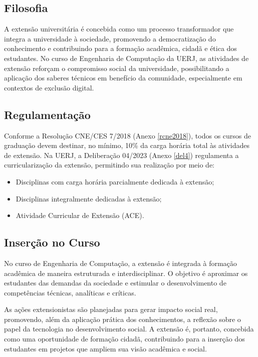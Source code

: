 \subsection{Filosofia}
A extensão universitária é concebida como um processo transformador que integra a universidade à sociedade, promovendo a democratização do conhecimento e contribuindo para a formação acadêmica, cidadã e ética dos estudantes. No curso de Engenharia de Computação da UERJ, as atividades de extensão reforçam o compromisso social da universidade, possibilitando a aplicação dos saberes técnicos em benefício da comunidade, especialmente em contextos de exclusão digital.

\subsection{Regulamentação}
Conforme a Resolução CNE/CES  7/2018 (Anexo \ref{rcne2018}), todos os cursos de graduação devem destinar, no mínimo, 10\% da carga horária total às atividades de extensão. Na UERJ, a Deliberação  04/2023 (Anexo \ref{del4}) regulamenta a curricularização da extensão, permitindo sua realização por meio de:

\begin{itemize}
    \item Disciplinas com carga horária parcialmente dedicada à extensão;
    \item Disciplinas integralmente dedicadas à extensão;
    \item Atividade Curricular de Extensão (ACE).
\end{itemize}

\subsection{Inserção no Curso}

No curso de Engenharia de Computação, a extensão é integrada à formação acadêmica de maneira estruturada e interdisciplinar. O objetivo é aproximar os estudantes das demandas da sociedade e estimular o desenvolvimento de competências técnicas, analíticas e críticas.

As ações extensionistas são planejadas para gerar impacto social real, promovendo, além da aplicação prática dos conhecimentos, a reflexão sobre o papel da tecnologia no desenvolvimento social. A extensão é, portanto, concebida como uma oportunidade de formação cidadã, contribuindo para a inserção dos estudantes em projetos que ampliem sua visão acadêmica e social.

